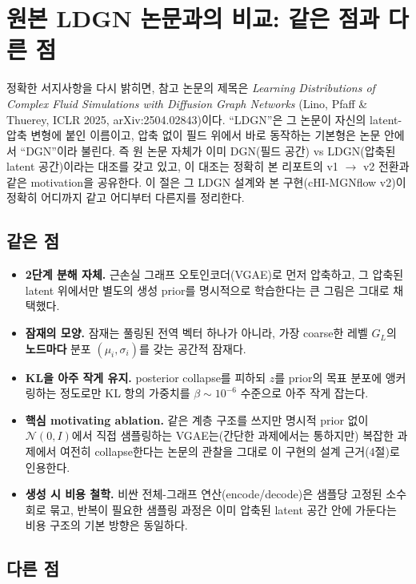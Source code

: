 \documentclass[11pt]{article}
\begin{document}
\section{원본 LDGN 논문과의 비교: 같은 점과 다른 점}

정확한 서지사항을 다시 밝히면, 참고 논문의 제목은 \textit{Learning
Distributions of Complex Fluid Simulations with Diffusion Graph Networks}
(Lino, Pfaff \& Thuerey, ICLR 2025, arXiv:2504.02843)이다. ``LDGN''은 그
논문이 자신의 latent-압축 변형에 붙인 이름이고, 압축 없이 필드 위에서
바로 동작하는 기본형은 논문 안에서 ``DGN''이라 불린다. 즉 원 논문 자체가
이미 DGN(필드 공간) vs LDGN(압축된 latent 공간)이라는 대조를 갖고 있고,
이 대조는 정확히 본 리포트의 v1 $\to$ v2 전환과 같은 motivation을
공유한다. 이 절은 그 LDGN 설계와 본 구현(cHI-MGNflow v2)이 정확히 어디까지
같고 어디부터 다른지를 정리한다.

\subsection{같은 점}

\begin{itemize}
\item \textbf{2단계 분해 자체.} 근손실 그래프 오토인코더(VGAE)로 먼저
  압축하고, 그 압축된 latent 위에서만 별도의 생성 prior를 명시적으로
  학습한다는 큰 그림은 그대로 채택했다.
\item \textbf{잠재의 모양.} 잠재는 풀링된 전역 벡터 하나가 아니라, 가장
  coarse한 레벨 $G_L$의 \textbf{노드마다} 분포 $(\mu_i,\sigma_i)$를 갖는
  공간적 잠재다.
\item \textbf{KL을 아주 작게 유지.} posterior collapse를 피하되 $z$를
  prior의 목표 분포에 앵커링하는 정도로만 KL 항의 가중치를
  $\beta \sim 10^{-6}$ 수준으로 아주 작게 잡는다.
\item \textbf{핵심 motivating ablation.} 같은 계층 구조를 쓰지만 명시적
  prior 없이 $\mathcal{N}(0,I)$에서 직접 샘플링하는 VGAE는(간단한
  과제에서는 통하지만) 복잡한 과제에서 여전히 collapse한다는 논문의
  관찰을 그대로 이 구현의 설계 근거(4절)로 인용한다.
\item \textbf{생성 시 비용 철학.} 비싼 전체-그래프 연산(encode/decode)은
  샘플당 고정된 소수 회로 묶고, 반복이 필요한 샘플링 과정은 이미 압축된
  latent 공간 안에 가둔다는 비용 구조의 기본 방향은 동일하다.
\end{itemize}

\subsection{다른 점}
\end{document}
